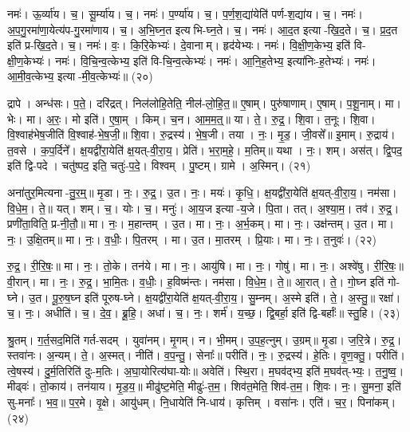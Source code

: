 नमः॑। ऊ॒र्व्या॑य। च॒। सू॒र्म्या॑य। च॒। 
नमः॑। प॒र्ण्या॑य। च॒। प॒र्ण॒श॒द्या॑येति॑ पर्ण-श॒द्या॑य। च॒। 
नमः॑। अ॒प॒गु॒रमा॑णा॒येत्य॑प-गु॒रमा॑णाय। च॒। अ॒भि॒घ्न॒त इत्यभि-घ्न॒ते। च॒। 
नमः॑। \mbox{आ॒\akhkhi{}द॒त} इत्या-खि॒द॒ते। च॒। \mbox{प्र॒\akhkhi{}द॒त} इति॑ प्र-खि॒द॒ते। च॒। 
नमः॑। वः॒। कि॒रि॒केभ्यः॑। दे॒वानाम्। हृद॑येभ्यः। नमः॑। 
वि॒क्षी॒ण॒केभ्य॒ इति॑ वि-क्षी॒ण॒केभ्यः॑। नमः॑। वि॒चि॒न्व॒त्केभ्य॒ इति॑ वि-चि॒न्व॒त्केभ्यः॑। नमः॑। 
आ॒नि॒\ar{}ह॒तेभ्य॒ इत्या॑निः-ह॒तेभ्यः॑। नमः॑। आ॒मी॒व॒त्केभ्य॒ इत्या-मी॒व॒त्केभ्यः॑॥ (२०)


द्रापे। अन्ध॑सः। प॒ते॒। दरि॑द्रत्। निल॑लोहि॒तेति॒ नील॑-लो॒हि॒त॒॥ 
ए॒षाम्। पुरु॑षाणाम्। ए॒षाम्। प॒शू॒नाम्। मा। भेः। मा। अ॒रः॒। मो इति॑। ए॒षा॒म्। किम्। च॒न। आ॒म॒म॒त्॒॥ 
या। ते॒। रु॒द्र॒। शि॒वा। त॒नूः। शि॒वा। वि॒श्वाह॑भेष॒जीति॑ वि॒श्वाह॑-भे॒ष॒जी॒॥ 
शि॒वा। रु॒द्रस्य॑। भे॒ष॒जी। तया। नः॒। मृ॒ड॒। जी॒वसे᳚॥ 
इ॒माम्। रु॒द्राय॑। त॒वसे। क॒प॒र्दिने᳚। क्ष॒यद्वी॑रा॒येति॑ क्ष॒यत्-वी॒रा॒य॒। प्रेति॑। भ॒रा॒म॒हे॒। म॒तिम्॥ 
यथा। नः॒। शम्। अस॑त्। द्वि॒पद॒ इति॑ द्वि-पदे। चतु॑ष्पद॒ इति॒ चतुः॑-प॒दे॒। विश्वम्। पु॒ष्टम्। ग्रामे। अ॒स्मिन्। (२१)


अना॑तुर॒मित्यना-तु॒र॒म्॒॥ 
मृ॒डा। नः॒। रु॒द्र॒। उ॒त। नः॒। मयः॑। कृ॒धि॒। क्ष॒यद्वी॑रा॒येति॑ क्ष॒यत्-वी॒रा॒य॒। नम॑सा। वि॒धे॒म॒। ते॒॥ 
यत्। शम्। च॒। योः। च॒। मनुः॑। आ॒य॒ज इत्या-य॒जे। पि॒ता। तत्। अ॒श्या॒म॒। तव॑। रु॒द्र॒। प्रणी॑ता॒विति॒ प्र-नी॒तौ॒॥ 
मा। नः॒। म॒हान्तम्। उ॒त। मा। नः॒। अ॒र्भ॒कम्। मा। नः॒। उक्ष॑न्तम्। उ॒त। मा। नः॒। उ॒क्षि॒तम्॥ 
मा। नः॒। व॒धीः॒। पि॒तरम्। मा। उ॒त। मा॒तरम्। प्रि॒याः। मा। नः॒। त॒नुवः॑। (२२)


रु॒द्र॒। री॒रि॒षः॒॥ 
मा। नः॒। तो॒के। तन॑ये। मा। नः॒। आयु॑षि। मा। नः॒। गोषु॑। मा। नः॒। अश्वे॑षु। री॒रि॒षः॒॥ 
वी॒रान्। मा। नः॒। रु॒द्र॒। भा॒मि॒तः। व॒धीः॒। ह॒विष्म॑न्तः। नम॑सा। वि॒धे॒म॒। ते॒॥ 
आ॒रात्। ते॒। गो॒घ्न इति॑ गो-घ्ने। उ॒त। पू॒रु॒ष॒घ्न इति॑ पूरुष-घ्ने। क्ष॒यद्वी॑रा॒येति॑ क्ष॒यत्-वी॒रा॒य॒। सु॒म्नम्। अ॒स्मे इति॑। ते॒। अ॒स्तु॒॥ 
रक्षा॑। च॒। नः॒। अधीति॑। च॒। दे॒व॒। ब्रू॒हि॒। अधा॑। च॒। नः॒। शर्म॑। य॒च्छ॒। द्वि॒बर्हा॒ इति॑ द्वि-बर्हाः᳚॥ 
स्तु॒हि। (२३)


श्रु॒तम्। ग॒र्त॒सद॒मिति॑ गर्त-सदम्। युवा॑नम्। मृ॒गम्। न। भी॒मम्। उ॒प॒ह॒त्नुम्। उ॒ग्रम्॥ 
मृ॒डा। ज॒रि॒त्रे। रु॒द्र॒। स्तवा॑नः। अ॒न्यम्। ते॒। अ॒स्मत्। नीति॑। व॒प॒न्तु॒। सेनाः᳚॥ 
परीति॑। नः॒। रु॒द्रस्य॑। हे॒तिः। वृ॒ण॒क्तु॒। परीति॑। त्वे॒षस्य॑। दु॒र्म॒तिरिति॑ दुः-म॒तिः। अ॒घा॒योरित्य॑घा-योः॥ 
अवेति॑। स्थि॒रा। म॒घव॑द्भ्य॒ इति॑ म॒घव॑त्-भ्यः॒। त॒नु॒ष्व॒। मीढ्वः॑। तो॒काय॑। तन॑याय। मृ॒ड॒य॒॥ 
मीढु॑ष्ट॒मेति॒ मीढुः॑-त॒म॒। शिव॑त॒मेति॒ शिव॑-त॒म॒। शि॒वः। नः॒। सु॒मना॒ इति॑ सु-मनाः᳚। भ॒व॒॥ 
प॒र॒मे। वृ॒क्षे। आयु॑धम्। नि॒धायेति॑ नि-धाय॑। कृत्तिम्। वसा॑नः। एति॑। च॒र॒। पिना॑कम्। (२४)


